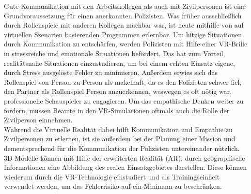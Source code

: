 Gute Kommunikation mit den Arbeitskollegen als auch mit Zivilpersonen ist eine Grundvoraussetzung für einen anerkannten Polizisten. Was früher ausschließlich durch Rollenspiele mit anderen Kollegen machbar war, ist heute mithilfe von auf virtuellen Szenarien basierenden Programmen erlernbar. Um hitzige Situationen durch Kommunikation zu entschärfen, werden Polizisten mit Hilfe einer VR-Brille in stressreiche und emotionale Situationen befördert. Das hat zum Vorteil, realitätsnahe Situationen einzustudieren, um bei einem echten Einsatz eigene, durch Stress ausgelöste Fehler zu minimieren. Außerdem erwies sich das Rollenspiel von Person zu Person als makelhaft, da es den Polizisten schwer fiel, den Partner als Rollenspiel Person anzuerkennen, weswegen es oft nötig war, professionelle Schauspieler zu engagieren. Um das empathische Denken weiter zu fördern, müssen Beamte in den VR-Simulationen oftmals auch die Rolle der Zivilperson einnehmen. 
\\
Während die Virtuelle Realität dabei hilft Kommunikation und Empathie zu Zivilpersonen zu erlernen, ist sie außerdem bei der Planung einer Mission und dementsprechend für die Kommunikation der Polizisten untereinander nützlich. 3D Modelle können mit Hilfe der erweiterten Realität (AR), durch geographische Informationen eine Abbildung des realen Einsatzgebietes darstellen. Diese können wiederum durch die VR-Technologie einstudiert und als Trainingseinheit verwendet werden, um das Fehlerrisiko auf ein Minimum zu beschränken.
